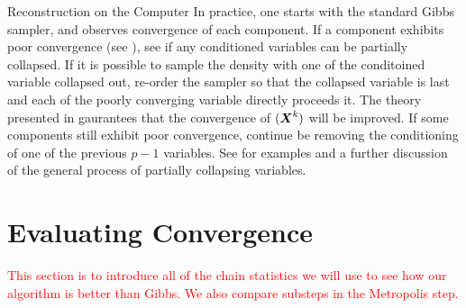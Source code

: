 \begin{chapter}{Reconstruction on the Computer}
In practice, one starts with the standard Gibbs sampler, and observes convergence of each component.
If a component exhibits poor convergence (see ), see if any conditioned variables can be partially collapsed.
If it is possible to sample the density with one of the conditoined variable collapsed out, re-order the sampler so that the collapsed variable is last and each of the poorly converging variable directly proceeds it. 
The theory presented in \citep{van2008partially} gaurantees that the convergence of $(\mbox{\boldmath$X$}^k)$ will be improved.
If some components still exhibit poor convergence, continue be removing the conditioning of one of the previous $p-1$ variables.
See \citep{van2008partially} for examples and a further discussion of the general process of partially collapsing variables.


%
%

\section{Evaluating Convergence} \label{sec:evaluatingConvergence}
\textcolor{red}{
  This section is to introduce all of the chain statistics we will use to see how our algorithm is better than Gibbs.
  We also compare substeps in the Metropolis step.
}

\end{chapter}
